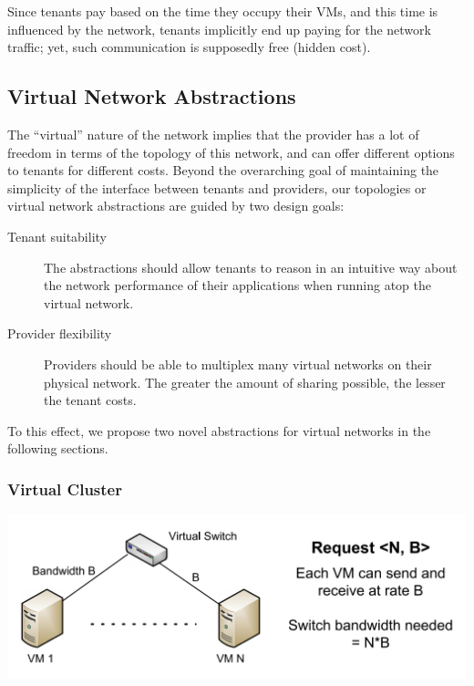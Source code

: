 
Since tenants pay based on the time they occupy their
VMs, and this time is influenced by the network, tenants
implicitly end up paying for the network traffic; yet, such
communication is supposedly free (hidden cost).

\subsection{Virtual Network Abstractions}

The “virtual” nature of the network implies that the provider
has a lot of freedom in terms of the topology of this
network, and can offer different options to tenants for different
costs. Beyond the overarching goal of maintaining the
simplicity of the interface between tenants and providers,
our topologies or virtual network abstractions are guided by
two design goals:

\begin{description}
\item[Tenant suitability] The abstractions should allow tenants
to reason in an intuitive way about the network performance
of their applications when running atop the virtual
network.
\item[Provider flexibility] Providers should be able to multiplex
many virtual networks on their physical network.
The greater the amount of sharing possible, the lesser
the tenant costs.
\end{description}

To this effect, we propose two novel abstractions for virtual
networks in the following sections.

\subsubsection{Virtual Cluster}

\includegraphics[width=0.8\linewidth]{img/virt_switch.png}

